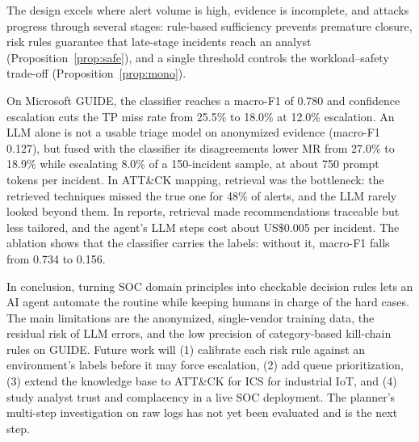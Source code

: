 \documentclass[conference]{IEEEtran}
\begin{document}
The design excels where alert volume is high, evidence is incomplete,
and attacks progress through several stages: rule-based sufficiency
prevents premature closure, risk rules guarantee that late-stage
incidents reach an analyst (Proposition~\ref{prop:safe}), and a single
threshold controls the workload--safety trade-off
(Proposition~\ref{prop:mono}).

On Microsoft GUIDE, the classifier reaches a macro-F1 of 0.780 and
confidence escalation cuts the TP miss rate from 25.5\% to 18.0\% at
12.0\% escalation. An LLM alone is not a usable triage model on
anonymized evidence (macro-F1 0.127), but fused with the classifier its
disagreements lower MR from 27.0\% to 18.9\% while escalating 8.0\% of
a 150-incident sample, at about 750 prompt tokens per incident.
In ATT\&CK mapping, retrieval was the bottleneck: the retrieved
techniques missed the true one for 48\% of alerts, and the LLM rarely
looked beyond them. In reports, retrieval made recommendations
traceable but less tailored, and the agent's LLM steps cost about
US\$0.005 per incident. The ablation shows that the classifier carries
the labels: without it, macro-F1 falls from 0.734 to 0.156.

In conclusion, turning SOC domain principles into checkable decision
rules lets an AI agent automate the routine while keeping humans in
charge of the hard cases. The main limitations are the anonymized,
single-vendor training data, the residual risk of LLM errors, and the
low precision of category-based kill-chain rules on GUIDE. Future work
will (1) calibrate each risk rule against an environment's labels before
it may force escalation, (2) add queue prioritization, (3) extend the
knowledge base to ATT\&CK for ICS for industrial IoT, and (4) study
analyst trust and complacency in a live SOC deployment. The
planner's multi-step investigation on raw logs has not yet been
evaluated and is the next step.
\end{document}

